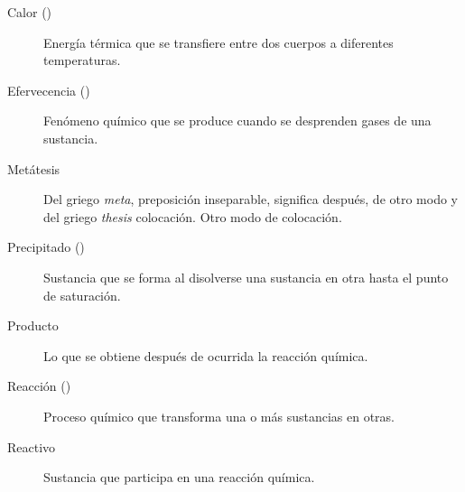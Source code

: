 \begin{defcard}
    \begin{description}
        \item[Calor (\ce{\Delta})] Energía térmica que se transfiere entre dos cuerpos a diferentes temperaturas.
        \item[Efervecencia (\ce{^})] Fenómeno químico que se produce cuando se desprenden gases de una sustancia.
        \item[Metátesis] Del griego \emph{meta}, preposición inseparable, significa después, de otro modo y del griego \emph{thesis} colocación. Otro modo de colocación.
        \item[Precipitado ()] Sustancia que se forma al disolverse una sustancia en otra hasta el punto de saturación.
        \item[Producto] Lo que se obtiene después de ocurrida la reacción química.
        \item[Reacción (\ce{->})] Proceso químico que transforma una o más sustancias en otras.
        \item[Reactivo] Sustancia que participa en una reacción química.
    \end{description}
\end{defcard}